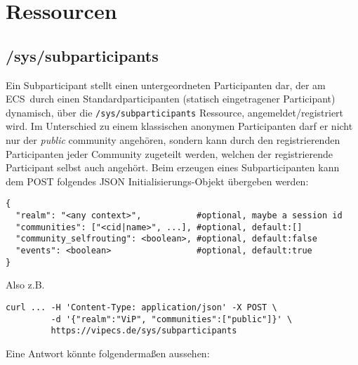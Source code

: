 \documentclass[dvips,12pt,a4paper]{article}
\newcommand{\ecs}{ECS}
\begin{document}
\section{Ressourcen}
\subsection{/sys/subparticipants}
Ein Subparticipant stellt einen untergeordneten Participanten dar, der am \ecs\
durch einen Standardparticipanten (statisch eingetragener Participant)
dynamisch, über die \texttt{/sys/subparticipants} Ressource,
angemeldet/registriert wird. Im Unterschied zu einem klassischen anonymen
Participanten darf er nicht nur der \textit{public} community angehören,
sondern kann durch den registrierenden Participanten jeder Community zugeteilt
werden, welchen der registrierende Participant selbst auch angehört. Beim
erzeugen eines Subparticipanten kann dem POST folgendes JSON
Initialisierungs-Objekt übergeben werden: 
\begin{verbatim}
{
  "realm": "<any context>",           #optional, maybe a session id
  "communities": ["<cid|name>", ...], #optional, default:[]
  "community_selfrouting": <boolean>, #optional, default:false
  "events": <boolean>                 #optional, default:true
}
\end{verbatim}
Also z.B.
\begin{verbatim}
curl ... -H 'Content-Type: application/json' -X POST \
         -d '{"realm":"ViP", "communities":["public"]}' \
         https://vipecs.de/sys/subparticipants
\end{verbatim}
Eine Antwort könnte folgendermaßen aussehen:
\end{document}
